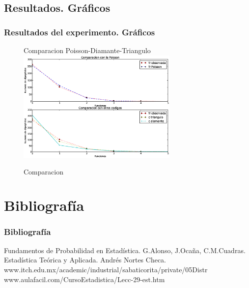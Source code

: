 \documentclass{beamer}
\begin{document}
\subsection{Resultados. Gráficos}
\begin{frame}
\frametitle{Resultados del experimento. Gráficos}


\begin{figure}[!ht]{Comparacion Poisson-Diamante-Triangulo\\}
\centering
\includegraphics[width=0.7\textwidth]{comparacion.eps}
\caption{Comparacion}
\end{figure}

\end{frame}
\section{Bibliografía}
\begin{frame}
\frametitle{Bibliografía}
\begin{thebibliography}{10}
\beamertemplatebookbibitems
\bibitem{}
Fundamentos de Probabilidad en Estadística. G.Alonso, J.Ocaña, C.M.Cuadras.
\bibitem{}
Estadística Teórica y Aplicada. Andrés Nortes Checa.
\bibitem{}
www.itch.edu.mx/academic/industrial/sabaticorita/private/05Distr
\bibitem{}
www.aulafacil.com/CursoEstadistica/Lecc-29-est.htm
\end{thebibliography}
\end{frame}





\end{document}
